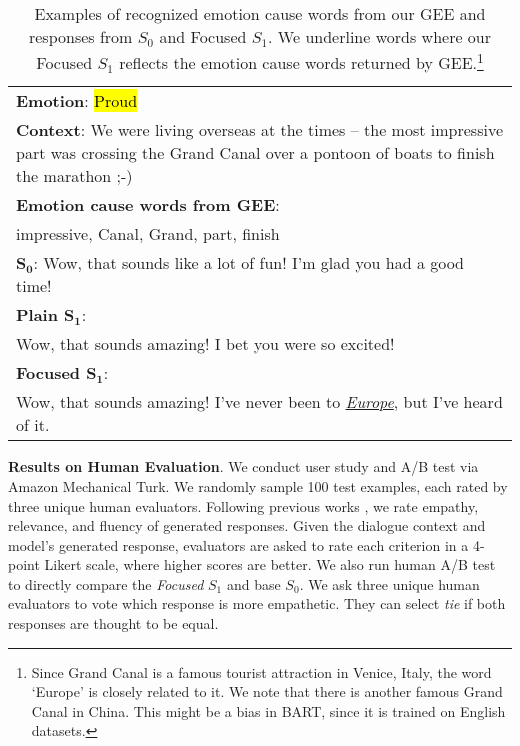 \documentclass[11pt]{article}
\newcommand{\hlc}[2][yellow]{{\colorlet{foo}{#1}\sethlcolor{foo}\hl{#2}}}
\newcommand{\proud}[1]{\hlc[proud]{#1}}
\begin{document}
{\begin{table}[t!]
\begin{center}
\begin{tabularx}{\linewidth}{X}
        \textbf{Emotion}: \proud{Proud} \\
        \textbf{Context}:
        We were living overseas at the times -- the most impressive part was crossing the Grand Canal over a pontoon of boats to finish the marathon ;-) \\
        \midrule
        \textbf{Emotion cause words from GEE}: \\
        impressive, Canal, Grand, part, finish \\
        \midrule
        \textbf{$\mathbf{S_0}$}: Wow, that sounds like a lot of fun! I'm glad you had a good time! \\
        \textbf{Plain $\mathbf{S_1}$}: \\ Wow, that sounds amazing! I bet you were so excited! \\
        \textbf{Focused $\mathbf{S_1}$}: \\ Wow, that sounds amazing! I've never been to \underline{\textit{Europe}}, but I've heard of it. \\
        \bottomrule
    \end{tabularx}
    \vspace{-5pt}
    \caption{
        Examples of recognized emotion cause words from our GEE and responses from $S_0$ and Focused $S_1$.
        We underline words where our Focused $S_1$ reflects the emotion cause words returned by GEE.\footnote{Since Grand Canal is a famous tourist attraction in Venice, Italy, the word `Europe' is closely related to it. We note that there is another famous Grand Canal in China. This might be a bias in BART, since it is trained on English datasets.}
    }
    \label{tab:generation_example}
\end{center}\end{table}}




\textbf{Results on Human Evaluation}.
We conduct user study and A/B test via Amazon Mechanical Turk.
We randomly sample 100 test examples, each rated by three unique human evaluators.
Following previous works \citep{Rashkin:2019:ACL, Lin:2019:EMNLP, Majumder:2020:EMNLP}, we rate empathy, relevance, and fluency of generated responses.
Given the dialogue context and model's generated response, evaluators are asked to rate each criterion in a 4-point Likert scale, where higher scores are better.
We also run human A/B test to directly compare the \textit{Focused} $S_1$ and base $S_0$.
We ask three unique human evaluators to vote which response is more empathetic.
They can select \textit{tie} if both responses are thought to be equal.
\end{document}
